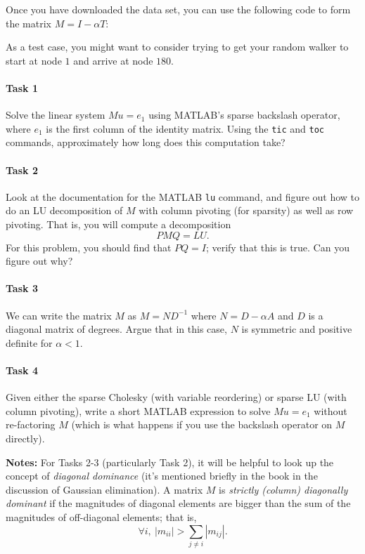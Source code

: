 \documentclass[12pt, leqno]{article}
\begin{document}
Once you have downloaded the data set, you can use the following code
to form the matrix $M = I-\alpha T$:


As a test case, you might want to consider trying to get your random
walker to start at node $1$ and arrive at node $180$.

\paragraph*{Task 1}
Solve the linear system $Mu = e_1$ using MATLAB's sparse backslash
operator, where $e_1$ is the first column of the identity matrix.
Using the {\tt tic} and {\tt toc} commands, approximately how long
does this computation take?

\paragraph*{Task 2}
Look at the documentation for the MATLAB {\tt lu} command, and figure
out how to do an LU decomposition of $M$ with column pivoting (for
sparsity) as well as row pivoting.  That is, you will compute a
decomposition
\[
  PMQ = LU.
\]
For this problem, you should find that $PQ = I$; verify that this is
true.  Can you figure out why?

\paragraph*{Task 3}
We can write the matrix $M$ as $M = N D^{-1}$ where $N = D-\alpha A$
and $D$ is a diagonal matrix of degrees.  Argue that in this case,
$N$ is symmetric and positive definite for $\alpha < 1$.

\paragraph*{Task 4}
Given either the sparse Cholesky (with variable reordering) or sparse
LU (with column pivoting), write a short MATLAB expression to solve
$Mu = e_1$ without re-factoring $M$ (which is what happens if you use
the backslash operator on $M$ directly).

{\bf Notes:} For Tasks 2-3 (particularly Task 2), it will be helpful
to look up the concept of {\em diagonal dominance} (it's mentioned
briefly in the book in the discussion of Gaussian elimination).  A
matrix $M$ is {\em strictly (column) diagonally dominant} if the
magnitudes of diagonal elements are bigger than the sum of the
magnitudes of off-diagonal elements; that is,
\[
  \forall i, ~ |m_{ii}| > \sum_{j \neq i} |m_{ij}|.
\]
  
\end{document}
